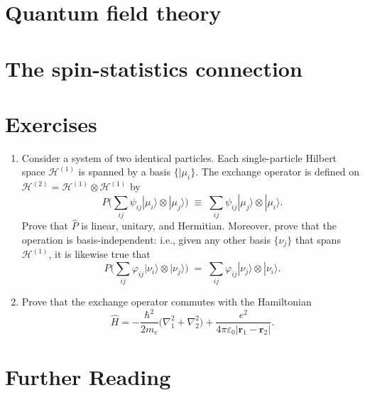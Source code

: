 \documentclass[pra,11pt]{revtex4}
\begin{document}
\section{Quantum field theory}
\label{sec:qft}

\section{The spin-statistics connection}
\label{sec:spinstats}

\section*{Exercises}

\begin{enumerate}
\item Consider a system of two identical particles.  Each
  single-particle Hilbert space $\mathscr{H}^{(1)}$ is spanned by a
  basis $\{|\mu_i\}$.  The exchange operator is defined on
  $\mathscr{H}^{(2)} = \mathscr{H}^{(1)} \otimes \mathscr{H}^{(1)}$ by
$$P \Big (\sum_{ij} \psi_{ij} |\mu_i\rangle\otimes|\mu_j\rangle \Big)
  \;\equiv\;  \sum_{ij} \psi_{ij} |\mu_j\rangle\otimes|\mu_i\rangle.$$
  Prove that $\hat{P}$ is linear, unitary, and Hermitian.  Moreover,
  prove that the operation is basis-independent: i.e., given any other
  basis $\{\nu_j\}$ that spans $\mathscr{H}^{(1)}$, it is likewise
  true that
$$P \Big (\sum_{ij} \varphi_{ij} |\nu_i\rangle\otimes|\nu_j\rangle \Big)
  \;=\;  \sum_{ij} \varphi_{ij} |\nu_j\rangle\otimes|\nu_i\rangle.$$
  \label{ex:1}

\item
  Prove that the exchange operator commutes with the Hamiltonian
$$\hat{H} = - \frac{\hbar^2}{2m_e} \Big(\nabla_1^2 + \nabla^2_2\Big) + \frac{e^2}{4\pi\varepsilon_0|\mathbf{r}_1 - \mathbf{r}_2|}.$$ \label{ex:2}
  
\end{enumerate}

\section*{Further Reading}

\end{document}
